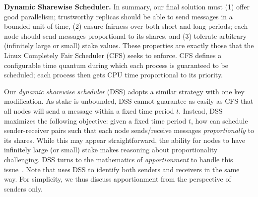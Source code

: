 \par \textbf{Dynamic Sharewise Scheduler.} In summary, our final solution must (1) offer good parallelism; trustworthy replicas should be able to send messages in a bounded unit of time, (2) ensure fairness over both short and long periods; each node should send messages proportional to its shares, and (3) tolerate arbitrary (infinitely large or small) stake values. These properties are exactly those that the Linux Completely Fair Scheduler (CFS) seeks to enforce. CFS defines a configurable time quantum during which each process is guaranteed to be scheduled; each process then gets CPU time proportional to its priority. 

Our \textit{dynamic sharewise scheduler} (DSS) adopts a similar strategy with one key modification. As stake is unbounded, DSS cannot guarantee as easily as CFS that all nodes will send a message within a fixed time period $t$. Instead, DSS maximizes the following objective: given a fixed time period $t$, how can \Scrooge{} schedule sender-receiver pairs such that each node sends/receive messages \textit{proportionally} to its shares. While this may appear straightforward, the ability for nodes to have infinitely large (or small) stake makes reasoning about proportionality challenging.
DSS turns to the mathematics of {\em apportionment} to handle this issue~\cite{apportionment,apportionment-math}.  Note that \Scrooge{} uses DSS to identify both senders and receivers in the same way. For simplicity, we thus discuss apportionment from the perspective of senders only. 

